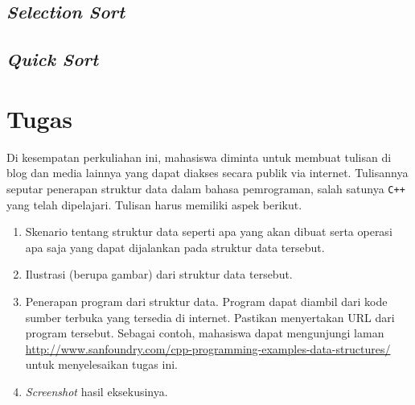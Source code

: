 \section{\textit{Selection Sort}}

\section{\textit{Quick Sort}}

\chapter{Tugas}
Di kesempatan perkuliahan ini, mahasiswa diminta untuk membuat tulisan di blog dan media lainnya yang dapat diakses secara publik via internet. Tulisannya seputar penerapan struktur data dalam bahasa pemrograman, salah satunya \texttt{C++} yang telah dipelajari. Tulisan harus memiliki aspek berikut.
\begin{enumerate}
\item Skenario tentang struktur data seperti apa yang akan dibuat serta operasi apa saja yang dapat dijalankan pada struktur data tersebut.
\item Ilustrasi (berupa gambar) dari struktur data tersebut.
\item Penerapan program dari struktur data. Program dapat diambil dari kode sumber terbuka yang tersedia di internet. Pastikan menyertakan URL dari program tersebut. Sebagai contoh, mahasiswa dapat mengunjungi laman \url{http://www.sanfoundry.com/cpp-programming-examples-data-structures/} untuk menyelesaikan tugas ini.
\item \textit{Screenshot} hasil eksekusinya.
\end{enumerate} 




